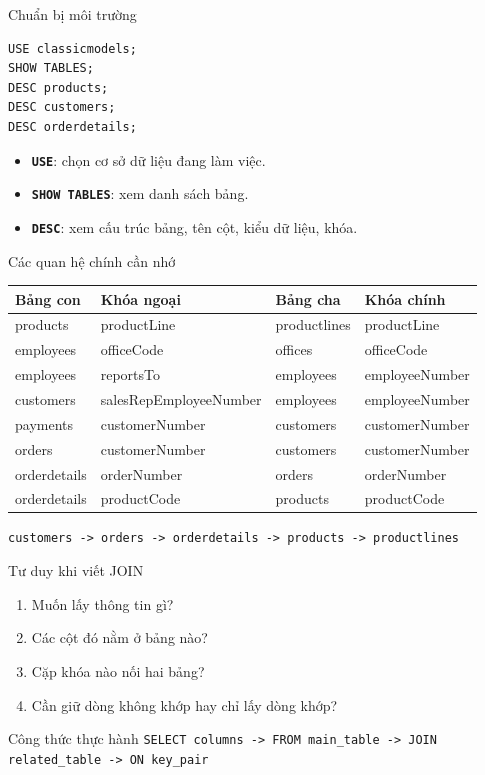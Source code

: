 \documentclass[aspectratio=169,11pt]{beamer}
\newcommand{\kw}[1]{\textbf{\texttt{#1}}}
\begin{document}
\begin{frame}[fragile]{Chuẩn bị môi trường}
\begin{lstlisting}
USE classicmodels;
SHOW TABLES;
DESC products;
DESC customers;
DESC orderdetails;
\end{lstlisting}
\begin{itemize}
  \item \kw{USE}: chọn cơ sở dữ liệu đang làm việc.
  \item \kw{SHOW TABLES}: xem danh sách bảng.
  \item \kw{DESC}: xem cấu trúc bảng, tên cột, kiểu dữ liệu, khóa.
\end{itemize}
\end{frame}

\begin{frame}{Các quan hệ chính cần nhớ}
\scriptsize
\begin{tabularx}{\textwidth}{l l l l}
\toprule
Bảng con & Khóa ngoại & Bảng cha & Khóa chính \\
\midrule
products & productLine & productlines & productLine \\
employees & officeCode & offices & officeCode \\
employees & reportsTo & employees & employeeNumber \\
customers & salesRepEmployeeNumber & employees & employeeNumber \\
payments & customerNumber & customers & customerNumber \\
orders & customerNumber & customers & customerNumber \\
orderdetails & orderNumber & orders & orderNumber \\
orderdetails & productCode & products & productCode \\
\bottomrule
\end{tabularx}
\vspace{0.5em}
\centering
\texttt{customers -> orders -> orderdetails -> products -> productlines}
\end{frame}

\begin{frame}{Tư duy khi viết JOIN}
\begin{enumerate}
  \item Muốn lấy thông tin gì?
  \item Các cột đó nằm ở bảng nào?
  \item Cặp khóa nào nối hai bảng?
  \item Cần giữ dòng không khớp hay chỉ lấy dòng khớp?
\end{enumerate}
\vspace{0.7em}
\begin{block}{Công thức thực hành}
\centering
\texttt{SELECT columns -> FROM main\_table -> JOIN related\_table -> ON key\_pair}
\end{block}
\end{frame}
\end{document}
